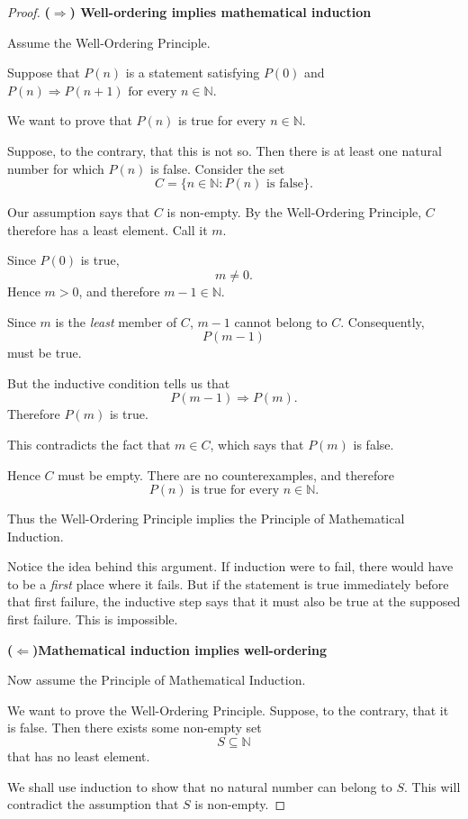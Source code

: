 \begin{proof}

\noindent
\textbf{($\Rightarrow$) Well-ordering implies mathematical induction}

Assume the Well-Ordering Principle.

Suppose that $P(n)$ is a statement satisfying
        $P(0)$  and $P(n)\Longrightarrow P(n+1) \text{ for every }n\in\mathbb N.$

We want to prove that $P(n)$ is true for every $n\in\mathbb N$.

Suppose, to the contrary, that this is not so. Then there is at least
one natural number for which $P(n)$ is false. Consider the set
\[
        C=\{n\in\mathbb N:P(n)\text{ is false}\}.
\]

Our assumption says that $C$ is non-empty. By the Well-Ordering
Principle, $C$ therefore has a least element. Call it $m$.

Since $P(0)$ is true,
\[
        m\neq0.
\]
Hence $m>0$, and therefore $m-1\in\mathbb N$.

Since $m$ is the \emph{least} member of $C$, $m-1$ cannot belong to
$C$. Consequently,
\[
        P(m-1)
\]
must be true.

But the inductive condition tells us that
\[
        P(m-1)\Longrightarrow P(m).
\]
Therefore $P(m)$ is true.

This contradicts the fact that $m\in C$, which says that $P(m)$ is
false.

Hence $C$ must be empty. There are no counterexamples, and therefore
\[
        P(n)\text{ is true for every }n\in\mathbb N.
\]

Thus the Well-Ordering Principle implies the Principle of Mathematical
Induction.

Notice the idea behind this argument. If induction were to fail, there
would have to be a \emph{first} place where it fails. But if the
statement is true immediately before that first failure, the inductive
step says that it must also be true at the supposed first failure.
This is impossible.

\noindent
\textbf{($\Leftarrow$)Mathematical induction implies well-ordering}

Now assume the Principle of Mathematical Induction.

We want to prove the Well-Ordering Principle. Suppose, to the contrary,
that it is false. Then there exists some non-empty set
\[
        S\subseteq\mathbb N
\]
that has no least element.

We shall use induction to show that no natural number can belong to
$S$. This will contradict the assumption that $S$ is non-empty.


\end{proof}
